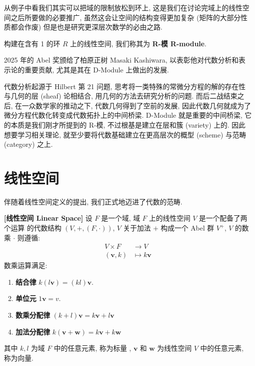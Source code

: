 \documentclass[UTF8]{book}
\begin{document}
从例子中看我们其实可以把域的限制放松到环上, 
这是我们在讨论完域上的线性空间之后所要做的必要推广, 
虽然这会让空间的结构变得更加复杂 (矩阵的大部分性质都会作废) 
但是也是研究更深层次数学的必由之路. 

构建在含有 1 的环 $R$ 上的线性空间, 
我们称其为 \textbf{R-模 R-module}. 

2025 年的 Abel 奖颁给了柏原正树 Masaki Kashiwara, 
以表彰他对代数分析和表示论的重要贡献, 尤其是其在 D-Module 
上做出的发展. 

代数分析起源于 Hilbert 第 21 问题, 思考将一类特殊的常微分方程的解的存在性
与几何的层 (sheaf) 论相结合, 用几何的方法去研究分析的问题. 
而后二战结束之后, 在一众数学家的推动之下, 代数几何得到了空前的发展, 
因此代数几何就成为了微分方程代数化转变成代数拓扑上的中间桥梁. 
D-Module 就是重要的中间桥梁, 它的本质是我们刚才所提到的 R-模, 
不过根基是建立在层和簇 (variety) 上的. 
因此想要学习相关理论, 就至少要将代数基础建立在更高层次的概型 (scheme) 
与范畴 (category) 之上. 




\section{线性空间}

伴随着线性空间定义的提出, 
我们正式地迈进了代数的范畴. 

\begin{definition}
    \textbf{[线性空间 Linear Space]} 
    设 $F$ 是一个域, 域 $F$ 上的线性空间 $V$ 是一个配备了两个运算
    的代数结构 $ (V,+,(F,\cdot)) $, $V$ 关于加法 $+$ 构成一个 Abel 群 
    $V^+$, $V$ 的数乘 $\cdot$ 则遵循: 
    $$ \begin{aligned}
    V \times F &\to V \\
    (\boldsymbol{v},k) &\mapsto k\boldsymbol{v}
    \end{aligned}
    $$
    数乘运算满足: 
    \begin{enumerate}[(1)]
        \item \textbf{结合律} $k(l\boldsymbol{v})=(kl)\boldsymbol{v}$.
        \item \textbf{单位元} $1\boldsymbol{v} = v$. 
        \item \textbf{数乘分配律} $(k+l)\boldsymbol{v} = k\boldsymbol{v} +
        l \boldsymbol{v}$
        \item \textbf{加法分配律} $k(\boldsymbol{v}+\boldsymbol{w})= 
        k \boldsymbol{v} + k\boldsymbol{w}$ 
    \end{enumerate}
    其中 $k,l$ 为域 $F$ 中的任意元素, 称为标量
    , $\boldsymbol{v}$ 和 $\boldsymbol{w}$ 为线性空间 $V$ 中的任意元素, 
    称为向量. 

\end{definition}
\end{document}
